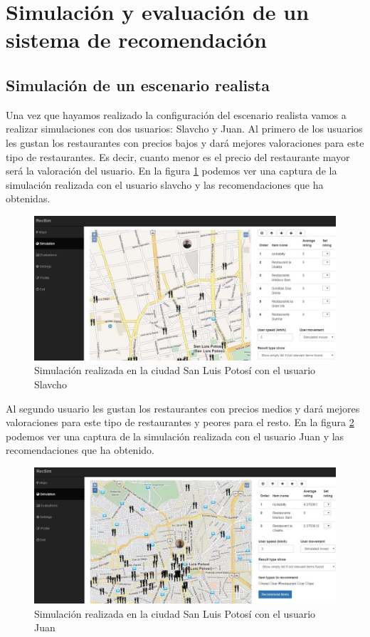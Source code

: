 \section{Simulación y evaluación de un sistema de recomendación}

\subsection{Simulación de un escenario realista}

Una vez que hayamos realizado la configuración del escenario realista vamos a realizar simulaciones con dos usuarios: Slavcho y Juan. Al primero de los usuarios les gustan los restaurantes con precios bajos y dará mejores valoraciones para este tipo de restaurantes. Es decir, cuanto menor es el precio del restaurante mayor será la valoración del usuario. En la figura \ref{simulacionSlavcho} podemos ver una captura de la simulación realizada con el usuario slavcho y las recomendaciones que ha obtenidas.

\begin{figure}[H]
	\centering\includegraphics[scale=0.35]{imagenes/explotacion/simulacion/simulacion-slavcho.jpg}
	\caption{Simulación realizada en la ciudad San Luis Potosí con el usuario Slavcho}
	\label{simulacionSlavcho}
\end{figure}

\newpage

Al segundo usuario les gustan los restaurantes con precios medios y dará mejores valoraciones para este tipo de restaurantes y peores para el resto. En la figura \ref{simulacionJuan} podemos ver una captura de la simulación realizada con el usuario Juan y las recomendaciones que ha obtenido. 

\begin{figure}[H]
	\centering\includegraphics[scale=0.35]{imagenes/explotacion/simulacion/simulacion-juan.jpg}
	\caption{Simulación realizada en la ciudad San Luis Potosí con el usuario Juan}
	\label{simulacionJuan}
\end{figure}

